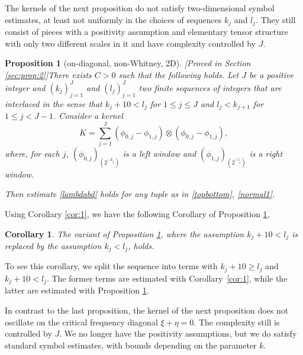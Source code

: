 \documentclass[12pt,reqno]{amsart}
\theoremstyle{plain}
\newtheorem{corollary}[theorem]{Corollary}
\newtheorem{proposition}[theorem]{Proposition}
\theoremstyle{definition}
\numberwithin{equation}{section}
\begin{document}
 

The kernels of the next proposition do not satisfy two-dimensional
symbol estimates, at least not uniformly in the choices of sequences
$k_j$ and $l_j$. They still consist of pieces with a positivity assumption and elementary tensor structure with only two different scales in it and have complexity controlled by $J$.
\begin{proposition}[on-diagonal, non-Whitney, 2D] [Proved in Section \ref{sec:prop:2}]\label{prop:2}
There exists $C>0$ such that the following holds. 
Let $J$ be a positive integer and   $(k_j)_{j=1}^J$ and $(l_j)_{j=1}^J$   two finite sequences of integers  that are interlaced in the sense that $k_{j}+10< l_j$ for $1\le j\le J$ and
$l_j< k_{j+1}$ for $1\le j<J-1$.
Consider a kernel
\[K=\sum_{j=1}^J ({\phi}_{0,j}-{\phi}_{1,j})\otimes  ({\phi}_{0,j}-{\phi}_{1,j}),\]
where, for each $j$,
${(\phi_{0,j})_{(2^{-k_j})}}$ is a left window 
and ${(\phi_{1,j})_{(2^{-l_j})}}$ is a right window.

Then estimate \eqref{lambdabd} holds for any tuple as in \eqref{topbottom}, \eqref{normal1}.
\end{proposition}

Using Corollary \ref{cor:1}, we have the following 
Corollary of Proposition \ref{prop:2}, 
\begin{corollary}
\label{cor:2}
The variant of Proposition \ref{prop:2}, where
the assumption $k_j+10<l_j$ is replaced by the assumption $k_j<l_j$, holds.
\end{corollary}
To see this corollary, we split the sequence into terms with
$k_j+10 \geq l_j$ and $k_j+10<l_j$. The former terms are estimated with
 Corollary~\ref{cor:1}, while the latter are estimated with
Proposition \ref{prop:2}.




In contrast to the last proposition, the kernel of the next proposition does not
oscillate on the critical frequency diagonal $\xi+\eta=0$. The complexity still is controlled by  $J$. We no longer have the positivity assumptions, but  we do satisfy standard symbol estimates, 
with bounds depending on the parameter $k$.
\end{document}
